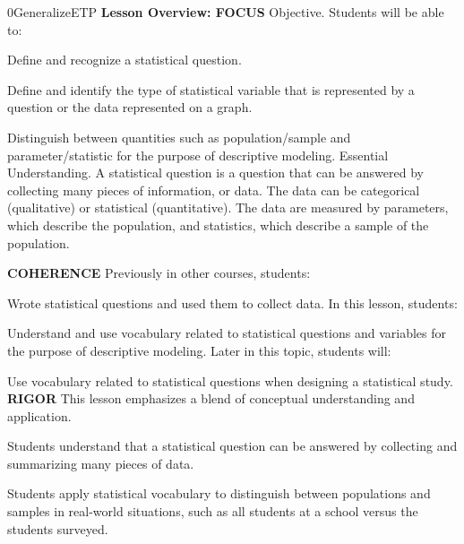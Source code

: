 \documentclass{article}
\newenvironment{te-addendum}[2]{}{}     %
\newcommand{\te}[1]{}                   %
\begin{document}
\begin{te-addendum}{0}{GeneralizeETP}
\textbf{Lesson Overview: FOCUS}
Objective. Students will be able to:
\item Define and recognize a statistical question.
\item Define and identify the type of statistical variable that is represented by a question or the data represented on a graph.
\item Distinguish between quantities such as population/sample and parameter/statistic for the purpose of descriptive modeling.
Essential Understanding. A statistical question is a question that can be answered by collecting many pieces of information, or data. The data can be categorical (qualitative) or statistical (quantitative). The data are measured by parameters, which describe the population, and statistics, which describe a sample of the population.
\te{Printed statistical (quantitative); likely quantitative rather than statistical.}
\textbf{COHERENCE}
Previously in other courses, students:
\item Wrote statistical questions and used them to collect data.
In this lesson, students:
\item Understand and use vocabulary related to statistical questions and variables for the purpose of descriptive modeling.
Later in this topic, students will:
\item Use vocabulary related to statistical questions when designing a statistical study.
\textbf{RIGOR}
This lesson emphasizes a blend of conceptual understanding and application.
\item Students understand that a statistical question can be answered by collecting and summarizing many pieces of data.
\item Students apply statistical vocabulary to distinguish between populations and samples in real-world situations, such as all students at a school versus the students surveyed.
\end{te-addendum}
\end{document}

